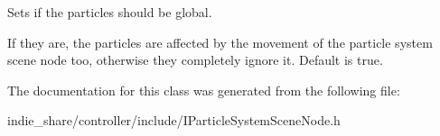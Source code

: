 Sets if the particles should be global. 

If they are, the particles are affected by the movement of the particle system scene node too, otherwise they completely ignore it. Default is true. 

The documentation for this class was generated from the following file\+:\begin{DoxyCompactItemize}
\item 
indie\+\_\+share/controller/include/I\+Particle\+System\+Scene\+Node.\+h\end{DoxyCompactItemize}
